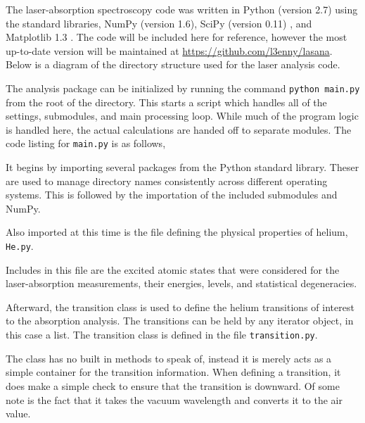 The laser-absorption spectroscopy code was written in Python (version 2.7) using
the standard libraries, NumPy (version 1.6), SciPy (version 0.11)
\cite{Jones2001}, and Matplotlib 1.3 \cite{Hunter2007}. The code will be
included here for reference, however the most up-to-date version will be
maintained at \url{https://github.com/l3enny/lasana}. Below is a diagram of the
directory structure used for the laser analysis code.

{
}

The analysis package can be initialized by running the command \texttt{python
main.py} from the root of the directory. This starts a script which handles all
of the settings, submodules, and main processing loop. While much of the program
logic is handled here, the actual calculations are handed off to separate
modules. The code listing for \texttt{main.py} is as follows,
\begin{singlespace}
  
\end{singlespace}
It begins by importing several packages from the Python standard library. Theser
are used to manage directory names consistently across different operating
systems. This is followed by the importation of the included submodules and
NumPy.

Also imported at this time is the file defining the physical properties of
helium, \texttt{He.py}.
\begin{singlespace}
  
\end{singlespace}
Includes in this file are the excited atomic states that were considered for the
laser-absorption measurements, their energies, levels, and statistical
degeneracies.

Afterward, the transition class is used to define the helium transitions
of interest to the absorption analysis. The transitions can be held by any
iterator object, in this case a list. The transition class is defined in the
file \texttt{transition.py}.
\begin{singlespace}
  
\end{singlespace}
The class has no built in methods to speak of, instead it is merely acts as a
simple container for the transition information. When defining a transition, it
does make a simple check to ensure that the transition is downward. Of some note
is the fact that it takes the vacuum wavelength and converts it to the air
value.

